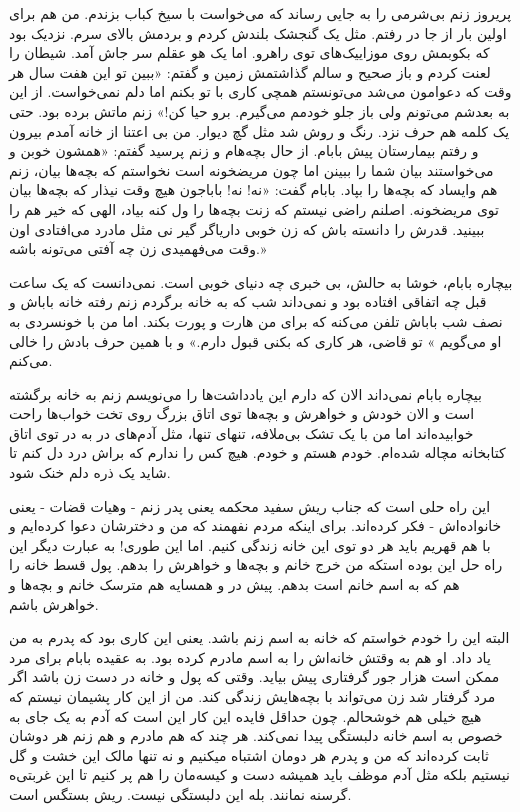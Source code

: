 \documentclass[12pt,a4paper]{book}
\begin{document}
پریروز زنم بی‌شرمی را به جایی رساند که می‌خواست با سیخ کباب بزندم. من هم برای اولین بار از جا در رفتم. مثل یک گنجشک بلندش کردم و بردمش بالای سرم. نزدیک بود که بکوبمش روی موزاییک‌های توی راهرو. اما یک هو عقلم سر جاش آمد. شیطان را لعنت کردم و باز صحیح و سالم گذاشتمش زمین و گفتم: «ببین تو این هفت سال هر وقت که دعوامون می‌شد می‌تونستم همچی کاری با تو بکنم اما دلم نمی‌خواست. از این به بعدشم می‌تونم ولی باز جلو خودمم می‌گیرم. برو حیا کن!» زنم ماتش برده بود. حتی یک کلمه هم حرف نزد. رنگ و روش شد مثل گچ دیوار. من بی اعتنا از خانه آمدم بیرون و رفتم بیمارستان پیش بابام. از حال بچه‌هام و زنم پرسید گفتم: «همشون خوبن و می‌خواستند بیان شما را ببینن اما چون مریضخونه است نخواستم که بچه‌ها بیان، زنم هم وایساد که بچه‌ها را بپاد. بابام گفت: «نه! نه! باباجون هیچ وقت نیذار که بچه‌ها بیان توی مریضخونه. اصلنم راضی نیستم که زنت بچه‌ها را ول کنه بیاد، الهی که خیر هم را ببینید. قدرش را دانسته باش که زن خوبی داریاگر گیر نی مثل مادرد می‌افتادی اون وقت می‌فهمیدی زن چه آفتی می‌تونه باشه.»

بیچاره بابام، خوشا به حالش، بی خبری چه دنیای خوبی است. نمی‌دانست که یک ساعت قبل چه اتفاقی افتاده بود و نمی‌داند شب که به خانه برگردم زنم رفته خانه باباش و نصف شب باباش تلفن می‌کنه که برای من هارت و پورت بکند. اما من با خونسردی به او می‌گویم » تو قاضی، هر کاری که بکنی قبول دارم.» و با همین حرف بادش را خالی می‌کنم.

بیچاره بابام نمی‌داند الان که دارم این یادداشت‌ها را می‌نویسم زنم به خانه برگشته است و الان خودش و خواهرش و بچه‌ها توی اتاق بزرگ روی تخت خواب‌ها راحت خوابیده‌اند اما من با یک تشک بی‌ملافه، تنهای تنها، مثل آدم‌های در به در توی اتاق کتابخانه مچاله شده‌ام. خودم هستم و خودم. هیچ کس را ندارم که براش درد دل کنم تا شاید یک ذره دلم خنک شود.

این راه حلی است که جناب ریش سفید محکمه یعنی پدر زنم - وهیات قضات - یعنی خانواده‌اش - فکر کرده‌اند. برای اینکه مردم نفهمند که من و دخترشان دعوا کرده‌ایم و با هم قهریم باید هر دو توی این خانه زندگی کنیم. اما این طوری! به عبارت دیگر این راه حل این بوده استکه من خرج خانم و بچه‌ها و خواهرش را بدهم. پول قسط خانه را هم که به اسم خانم است بدهم. پیش در و همسایه هم مترسک خانم و بچه‌ها و خواهرش باشم.

البته این را خودم خواستم که خانه به اسم زنم باشد. یعنی این کاری بود که پدرم به من یاد داد. او هم به وقتش خانه‌اش را به اسم مادرم کرده بود. به عقیده بابام برای مرد ممکن است هزار جور گرفتاری پیش بیاید. وقتی که پول و خانه در دست زن باشد اگر مرد گرفتار شد زن می‌تواند با بچه‌هایش زندگی کند. من از این کار پشیمان نیستم که هیچ خیلی هم خوشحالم. چون حداقل فایده این کار این است که آدم به یک جای به خصوص به اسم خانه دلبستگی پیدا نمی‌کند. هر چند که هم مادرم و هم زنم هر دوشان ثابت کرده‌اند که من و پدرم هر دومان اشتباه میکنیم و نه تنها مالک این خشت و گل نیستیم بلکه مثل آدم موظف باید همیشه دست و کیسه‌مان را هم پر کنیم تا این غربتی‌ه گرسنه نمانند. بله این دلبستگی نیست. ریش بستگس است.
\end{document}
